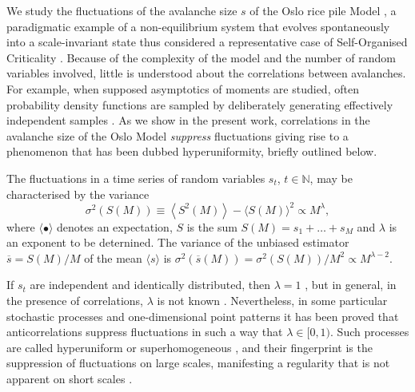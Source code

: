 \documentclass[doublecol]{epl2}
\newcommand{\elabel}[1]{\label{eq:#1}}
\begin{document}
We study the fluctuations of the avalanche size $s$ of the Oslo rice pile Model \cite{ChristensenETAL:1996},  a paradigmatic example of a non-equilibrium system that evolves spontaneously into a scale-invariant state thus considered a representative case of Self-Organised Criticality \cite{ChristensenETAL:1996, PhysRevLett.77.111, pruessner2003oslo, PhysRevE.94.042314, pruessner2012self, corral2004calculation, dhar2004steady}.
Because of the complexity of the model and the number of random variables involved, little is understood about the correlations between avalanches. For example,  when supposed asymptotics of moments are studied, often probability density functions are sampled by deliberately generating effectively independent samples \cite{najafi2012avalanche}. As we show in the present work, correlations in the avalanche size of the Oslo Model \emph{suppress} fluctuations giving rise to a phenomenon that has been dubbed hyperuniformity, briefly outlined below.

The fluctuations in a time series of random variables $s_t$, $t\in\mathbb{N}$, may be characterised by the variance
\begin{equation}
\sigma^2(S(M))\equiv\left\langle S^2(M) \right\rangle - \langle S(M) \rangle ^2 \propto M^\lambda,
\elabel{eq_fluc}
\end{equation}
where $\langle\bullet\rangle$ denotes an expectation, $S$ is the sum $S(M)=s_1+\ldots+s_M$ and $\lambda$ is an exponent to be deternined. The variance of the unbiased  \cite{brandt1999data} estimator $\overline{s}=S(M)/M$ of the mean  $\langle s \rangle$ is $\sigma^2\left( \overline{s}(M) \right) = \sigma^2(S(M))/M^2\propto M^{\lambda-2}$.

If $s_t$ are independent and identically distributed, then $\lambda=1$ \cite{van1992stochastic}, but in general, in the presence of correlations, $\lambda$ is not known \cite{papoulis1965probability,gardiner1986handbook,gikhman2015theory}.
Nevertheless, in some particular stochastic processes  \cite{welinder2007multiscaling} and one-dimensional point patterns \cite{Torquato:2003aa, Hexner:2017aa} it has been proved that anticorrelations suppress fluctuations in such a way that $\lambda\in[0,1)$. Such processes are called hyperuniform \cite{Torquato:2003aa,Hexner:2017aa} or superhomogeneous \cite{PhysRevD.65.083523}, and their fingerprint is the suppression of fluctuations on large  scales, manifesting a regularity that is not apparent on short scales \cite{welinder2007multiscaling,zachary2009hyperuniformity, Torquato:2003aa, Hexner:2017aa, hexner2017enhanced,PhysRevD.65.083523,berthier2011suppressed,froufe2016role}.
\end{document}
